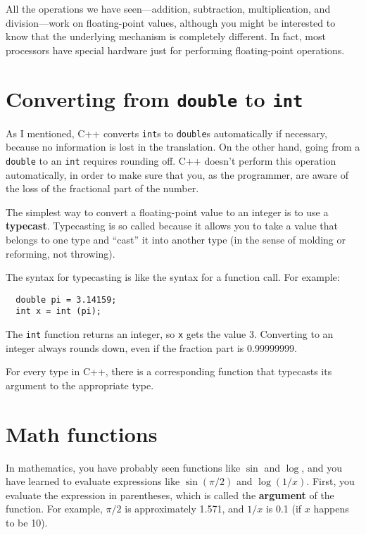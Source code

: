 
All the operations we have seen---addition, subtraction,
multiplication, and division---work on floating-point values,
although you might be interested to know that the underlying mechanism
is completely different.  In fact, most processors have special
hardware just for performing floating-point operations.

\section{Converting from {\tt double} to {\tt int}}
\label{rounding}

As I mentioned, C++ converts {\tt int}s
to {\tt double}s automatically if necessary, because no
information is lost in the translation.  On the other hand,
going from a {\tt double} to an {\tt int} requires rounding
off.  C++ doesn't perform this operation automatically, in
order to make sure that you, as the programmer, are aware
of the loss of the fractional part of the number.

The simplest way to convert a floating-point value to an integer is to
use a {\bf typecast}.  Typecasting is so called because it allows you
to take a value that belongs to one type and ``cast'' it into another
type (in the sense of molding or reforming, not throwing).

The syntax for typecasting is like the syntax
for a function call.  For example:

\begin{lstlisting}
  double pi = 3.14159;
  int x = int (pi);
\end{lstlisting}
%
The {\tt int} function returns an integer, so {\tt x} gets the value
3.  Converting to an integer always rounds down, even if the fraction
part is 0.99999999.

For every type in C++, there is a corresponding function that
typecasts its argument to the appropriate type.

\section{Math functions}

In mathematics, you have probably seen functions like $\sin$ and
$\log$, and you have learned to evaluate expressions like
$\sin(\pi/2)$ and $\log(1/x)$.  First, you evaluate the
expression in parentheses, which is called the {\bf argument} of the
function.  For example, $\pi/2$ is approximately 1.571, and $1/x$ is
0.1 (if $x$ happens to be 10).


